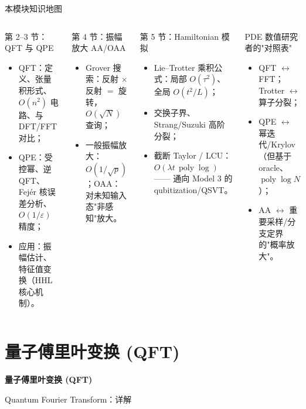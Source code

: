\documentclass[aspectratio=169,10pt]{ctexbeamer}
\newcommand{\eps}{\varepsilon}
\newcommand{\poly}{\operatorname{poly}}
\begin{document}
\begin{frame}{本模块知识地图}
\begin{columns}[T,totalwidth=\textwidth]
\begin{keybox}{第 2--3 节：QFT 与 QPE}
\begin{itemize}
\item QFT：定义、张量积形式、$O(n^2)$ 电路、与 DFT/FFT 对比；
\item QPE：受控幂、逆 QFT、Fejér 核误差分析、$O(1/\eps)$ 精度；
\item 应用：振幅估计、特征值变换（HHL 核心机制）。
\end{itemize}
\end{keybox}
\begin{keybox}{第 4 节：振幅放大 AA/OAA}
\begin{itemize}
\item Grover 搜索：反射 $\times$ 反射 $=$ 旋转，$O(\sqrt N)$ 查询；
\item 一般振幅放大：$O(1/\sqrt p)$；OAA：对未知输入态"非感知"放大。
\end{itemize}
\end{keybox}
\begin{keybox}{第 5 节：Hamiltonian 模拟}
\begin{itemize}
\item Lie--Trotter 乘积公式：局部 $O(\tau^2)$、全局 $O(t^2/L)$；
\item 交换子界、Strang/Suzuki 高阶分裂；
\item 截断 Taylor / LCU：$O(\lambda t\,\poly\log)$ —— 通向 Model 3 的 qubitization/QSVT。
\end{itemize}
\end{keybox}
\begin{warnbox}{PDE 数值研究者的"对照表"}
\begin{itemize}
\item QFT $\leftrightarrow$ FFT；Trotter $\leftrightarrow$ 算子分裂；
\item QPE $\leftrightarrow$ 幂迭代/Krylov（但基于 oracle、$\poly\log N$）；
\item AA $\leftrightarrow$ 重要采样/分支定界的"概率放大"。
\end{itemize}
\end{warnbox}
\end{columns}
\end{frame}

\section{量子傅里叶变换 (QFT)}
\begin{frame}[plain]
\centering\vspace{2.0cm}
{\Huge\bfseries\color{navy} 量子傅里叶变换 (QFT)}\par\vspace{4mm}
{\large Quantum Fourier Transform：详解}
\end{frame}
\end{document}
